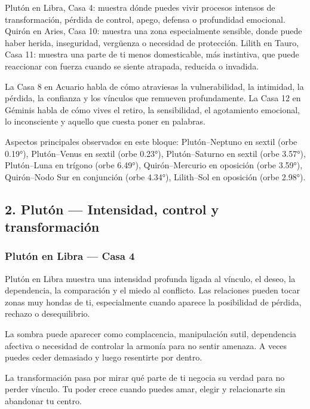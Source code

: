 \documentclass[11pt,a4paper]{article}
\begin{document}
Plutón en Libra, Casa 4: muestra dónde puedes vivir procesos intensos de transformación, pérdida de control, apego, defensa o profundidad emocional.
Quirón en Aries, Casa 10: muestra una zona especialmente sensible, donde puede haber herida, inseguridad, vergüenza o necesidad de protección.
Lilith en Tauro, Casa 11: muestra una parte de ti menos domesticable, más instintiva, que puede reaccionar con fuerza cuando se siente atrapada, reducida o invadida.

La Casa 8 en Acuario habla de cómo atraviesas la vulnerabilidad, la intimidad, la pérdida, la confianza y los vínculos que remueven profundamente.
La Casa 12 en Géminis habla de cómo vives el retiro, la sensibilidad, el agotamiento emocional, lo inconsciente y aquello que cuesta poner en palabras.

Aspectos principales observados en este bloque: Plutón–Neptuno en sextil (orbe 0.19°), Plutón–Venus en sextil (orbe 0.23°), Plutón–Saturno en sextil (orbe 3.57°), Plutón–Luna en trígono (orbe 6.49°), Quirón–Mercurio en oposición (orbe 3.59°), Quirón–Nodo Sur en conjunción (orbe 4.34°), Lilith–Sol en oposición (orbe 2.98°).

\vspace{0.4cm}

\subsection{2. Plutón — Intensidad, control y transformación}

\subsubsection*{Plutón en Libra — Casa 4}

Plutón en Libra muestra una intensidad profunda ligada al vínculo, el deseo, la dependencia, la comparación y el miedo al conflicto. Las relaciones pueden tocar zonas muy hondas de ti, especialmente cuando aparece la posibilidad de pérdida, rechazo o desequilibrio.

La sombra puede aparecer como complacencia, manipulación sutil, dependencia afectiva o necesidad de controlar la armonía para no sentir amenaza. A veces puedes ceder demasiado y luego resentirte por dentro.

La transformación pasa por mirar qué parte de ti negocia su verdad para no perder vínculo. Tu poder crece cuando puedes amar, elegir y relacionarte sin abandonar tu centro.
\end{document}
